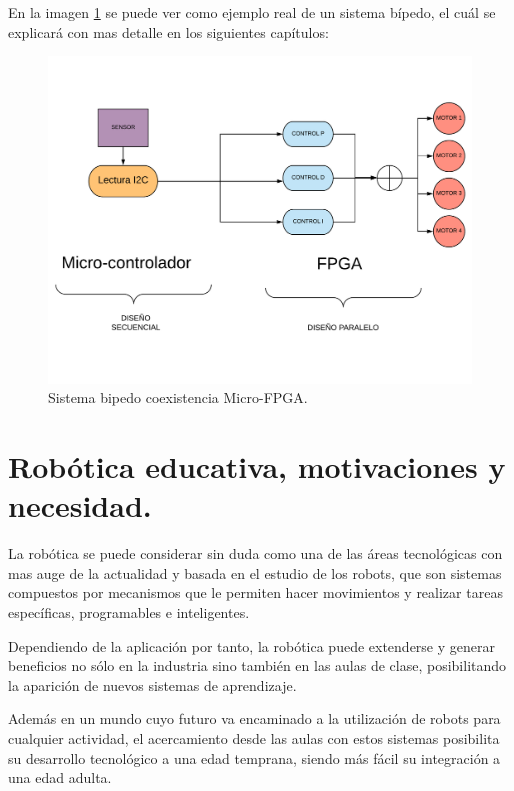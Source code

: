 En la imagen \ref{fig:bipedo} se puede ver como ejemplo real de un sistema bípedo, el cuál se explicará con mas detalle en los siguientes capítulos:

\begin{center}
	\begin{figure}[H]
		\center
		\includegraphics[scale=0.5]{imagenes/EstadoArte/bipedo.pdf}
		\caption{Sistema bipedo coexistencia Micro-FPGA.}
		\label{fig:bipedo}
	\end{figure}
\end{center}
\section{Robótica educativa, motivaciones y necesidad.}

La robótica se puede considerar sin duda como una de las áreas tecnológicas con mas auge de la actualidad y basada en el estudio de los robots, que son sistemas compuestos por mecanismos que le permiten hacer movimientos y realizar tareas específicas, programables e inteligentes. \newline

Dependiendo de la aplicación por tanto, la robótica puede extenderse y generar beneficios no sólo en la industria sino también en las aulas de clase, posibilitando la aparición de nuevos sistemas de aprendizaje.\newline

Además en un mundo cuyo futuro va encaminado a la utilización de robots para cualquier actividad, el acercamiento desde las aulas con estos sistemas posibilita su desarrollo tecnológico a una edad temprana, siendo más fácil su integración a una edad adulta.\newline

